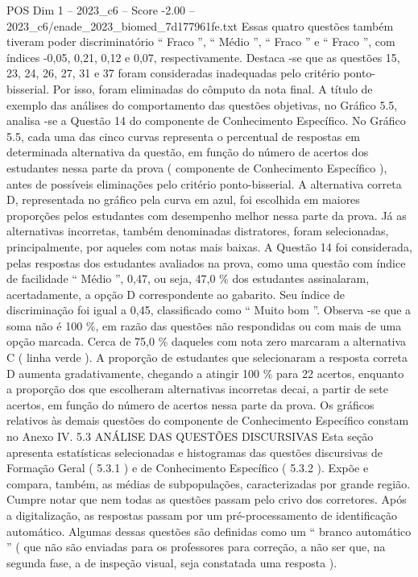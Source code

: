 \begin{textsample}{POS Dim 1 – 2023\_c6 – Score -2.00 – 2023\_c6/enade\_2023\_biomed\_7d177961fe.txt}
Essas quatro questões também tiveram poder discriminatório “ Fraco ”, “ Médio ”, “ Fraco ” e “ Fraco ”, com índices -0,05, 0,21, 0,12 e 0,07, respectivamente.
Destaca -se que as questões 15, 23, 24, 26, 27, 31 e 37 foram consideradas inadequadas pelo critério ponto-bisserial.
Por isso, foram eliminadas do cômputo da nota final.
A título de exemplo das análises do comportamento das questões objetivas, no Gráfico 5.5, analisa -se a Questão 14 do componente de Conhecimento Específico.
No Gráfico 5.5, cada uma das cinco curvas representa o percentual de respostas em determinada alternativa da questão, em função do número de acertos dos estudantes nessa parte da prova ( componente de Conhecimento Específico ), antes de possíveis eliminações pelo critério ponto-bisserial.
A alternativa correta D, representada no gráfico pela curva em azul, foi escolhida em maiores proporções pelos estudantes com desempenho melhor nessa parte da prova.
Já as alternativas incorretas, também denominadas distratores, foram selecionadas, principalmente, por aqueles com notas mais baixas.
A Questão 14 foi considerada, pelas respostas dos estudantes avaliados na prova, como uma questão com índice de facilidade “ Médio ”, 0,47, ou seja, 47,0 \% dos estudantes assinalaram, acertadamente, a opção D correspondente ao gabarito.
Seu índice de discriminação foi igual a 0,45, classificado como “ Muito bom ”.
Observa -se que a soma não é 100 \%, em razão das questões não respondidas ou com mais de uma opção marcada.
Cerca de 75,0 \% daqueles com nota zero marcaram a alternativa C ( linha verde ).
A proporção de estudantes que selecionaram a resposta correta D aumenta gradativamente, chegando a atingir 100 \% para 22 acertos, enquanto a proporção dos que escolheram alternativas incorretas decai, a partir de sete acertos, em função do número de acertos nessa parte da prova.
Os gráficos relativos às demais questões do componente de Conhecimento Específico constam no Anexo IV. 5.3 ANÁLISE DAS QUESTÕES DISCURSIVAS Esta seção apresenta estatísticas selecionadas e histogramas das questões discursivas de Formação Geral ( 5.3.1 ) e de Conhecimento Específico ( 5.3.2 ).
Expõe e compara, também, as médias de subpopulações, caracterizadas por grande região.
Cumpre notar que nem todas as questões passam pelo crivo dos corretores.
Após a digitalização, as respostas passam por um pré-processamento de identificação automático.
Algumas dessas questões são definidas como um “ branco automático ” ( que não são enviadas para os professores para correção, a não ser que, na segunda fase, a de inspeção visual, seja constatada uma resposta ).

\end{textsample}
